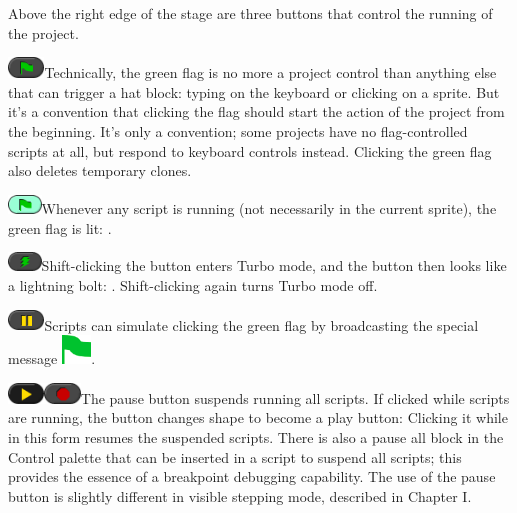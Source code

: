 Above the right edge of the stage are three buttons that control the
running of the project.

\includegraphics[width=0.38in,height=0.22in]{media/image1037.png}Technically,
the green flag is no more a project control than anything else that can
trigger a hat block: typing on the keyboard or clicking on a sprite. But
it's a convention that clicking the flag should start the action of the
project from the beginning. It's only a convention; some projects have
no flag-controlled scripts at all, but respond to keyboard controls
instead. Clicking the green flag also deletes temporary clones.

\includegraphics[width=0.35in,height=0.2in]{media/image1038.png}Whenever
any script is running (not necessarily in the current sprite), the green
flag is lit: .

\includegraphics[width=0.35in,height=0.2in]{media/image1039.png}Shift-clicking
the button enters Turbo mode, and the button then looks like a lightning
bolt: . Shift-clicking again turns Turbo mode off.

\includegraphics[width=0.37917in,height=0.21667in]{media/image1044.png}Scripts
can simulate clicking the green flag by broadcasting the special message
\includegraphics[width=0.30556in,height=0.30556in]{media/image1045.png}.

\includegraphics[width=0.37917in,height=0.21667in]{media/image1046.png}\includegraphics[width=0.37917in,height=0.21667in]{media/image1047.png}The
pause button suspends running all scripts. If clicked while scripts are
running, the button changes shape to become a play button: Clicking it
while in this form resumes the suspended scripts. There is also a pause
all block in the Control palette that can be inserted in a script to
suspend all scripts; this provides the essence of a breakpoint debugging
capability. The use of the pause button is slightly different in visible
stepping mode, described in Chapter I.

